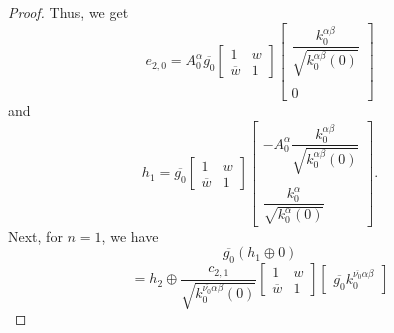 \documentclass[reqno,11pt,centertags]{article}
\theoremstyle{definition}
\def\a{\alpha}
\def\b{\beta}
\def\d{\delta}
\def\D{\Delta}
\begin{document}
\begin{proof}
Thus, we get
$$
e_{2,0}=
A^\a_0
\overline{g_0}
\begin{bmatrix}
1 & w \\
\overline{w} & 1
\end{bmatrix}
\begin{bmatrix}
\dfrac{k^{{\alpha\b}}_0}{\sqrt{k^{{\alpha\b}}_0(0)}}
\\ \\
0
\end{bmatrix}
$$
and
$$
h_1=
\overline{g_0}
\begin{bmatrix}
1 & w \\
\overline{w} & 1
\end{bmatrix}
\begin{bmatrix}
-A^\a_0\dfrac{k^{{\alpha\b}}_0}{\sqrt{k^{{\alpha\b}}_0(0)}}
\\ \\
\dfrac{k^\a_0}{\sqrt{k^\a_0(0)}}
\end{bmatrix}.
$$
Next, for $n=1$, we have
$$
\overline{g_0}
\left(
h_1
\oplus
0
\right)
$$
$$
=
h_{2}
\oplus
\dfrac{c_{2,1}}{\sqrt{k^{\overline{\nu_0}\alpha\b}_0(0)}}
\begin{bmatrix}
1 & w \\
\overline{w} & 1
\end{bmatrix}
\begin{bmatrix}
\overline{g_0} k^{\overline{\nu_0}\alpha\b}_0

\end{bmatrix}$$
\end{proof}
\end{document}
